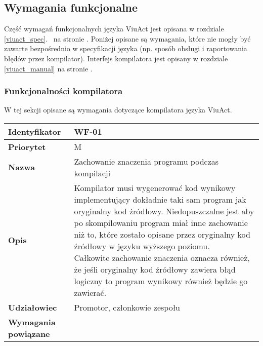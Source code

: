 \subsection{Wymagania funkcjonalne}

Część wymagań funkcjonalnych języka ViuAct jest opisana w rozdziale
\ref{viuact_spec}.~ na stronie \pageref{viuact_spec}.
Poniżej opisane są wymagania, które nie mogły być zawarte bezpośrednio w specyfikacji języka (np. sposób
obsługi i raportowania błędów przez kompilator).
Interfejs kompilatora jest opisany w rozdziale \ref{viuact_manual} na stronie \pageref{viuact_manual}.

\subsubsection{Funkcjonalności kompilatora}

W tej sekcji opisane są wymagania dotyczące kompilatora języka ViuAct.

\vspace{1em}

\begin{tabular}{ | l | l | }
    \hline
    \textbf{Identyfikator} & \parbox[t]{11cm}{WF-01} \\
    \hline
    \textbf{Priorytet} & M \\
    \hline
    \textbf{Nazwa} & Zachowanie znaczenia programu podczas kompilacji \\
    \hline
    \textbf{Opis} & \parbox[t]{11cm}{
        Kompilator musi wygenerować kod wynikowy implementujący dokładnie taki sam program jak oryginalny
        kod źródłowy. Niedopuszczalne jest aby po skompilowaniu program miał inne zachowanie niż to, które
        zostało opisane przez oryginalny kod źródłowy w języku wyższego poziomu.
        \\
        Całkowite zachowanie znaczenia oznacza również, że jeśli oryginalny kod źródłowy zawiera błąd
        logiczny to program wynikowy również będzie go zawierać.
    } \\
    \hline
    \textbf{Udziałowiec} & Promotor, członkowie zespołu \\
    \hline
    \textbf{Wymagania powiązane} & \phantom{} \\
    \hline
\end{tabular}

\vspace{1em}

